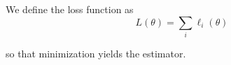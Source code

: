 \documentclass[article]{jss}
\begin{document}
We define the loss function as
\begin{equation}
L(\theta) = \sum_i \ell_i(\theta)
\end{equation}

so that minimization yields the estimator.
\end{document}
